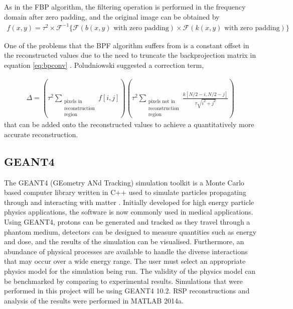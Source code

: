 \documentclass[11pt,a4paper]{article}
\begin{document}
As in the FBP algorithm, the filtering operation is performed in the frequency domain after zero padding, and the original image can be obtained by
\begin{align}
f(x,y) = \tau^2 \times \mathcal{F}^{-1}\{\mathcal{F}(b(x,y) \text{ with zero padding}) \times \mathcal{F}(k(x,y) \text{ with zero padding})\} 
\end{align}

One of the problems that the BPF algorithm suffers from is a constant offset in the reconstructed values due to the need to truncate the backprojection matrix in equation \ref{eq:bpconv} \cite{suzuki1988comparison}. Poludniowski suggested a correction term, 

\begin{eqnarray}
\Delta = \left( \tau^2 \sum_{\substack{\text{pixels in}\\\text{reconstruction}\\\text{region}}} f[i,j] \right) \left( \tau^2 \sum_{\substack{\text{pixels not in}\\\text{reconstruction}\\\text{region}}} \frac{k[N/2 - i, N/2 - j]}{\tau\sqrt{i^2 + j^2}}\right)
\label{eq:correction}
\end{eqnarray}
that can be added onto the reconstructed values to achieve a quantitatively more accurate reconstruction.

\subsection{GEANT4}
\label{sec:geant4}
The GEANT4 (GEometry ANd	Tracking) simulation toolkit is a Monte Carlo based computer library written in C++ used to simulate particles propagating through and interacting with matter \cite{agostinelli2003geant4}. Initially developed for high energy particle physics applications, the software is now commonly used in medical applications. Using GEANT4, protons can be generated and tracked as they travel through a phantom medium, detectors can be designed to measure quantities such as energy and dose, and the results of the simulation can be visualised. Furthermore, an abundance of physical processes are available to handle the diverse interactions that may occur over a wide energy range. The user must select an appropriate physics model for the simulation being run. The validity of the physics model can be benchmarked by comparing to experimental results. Simulations that were performed in this project will be using GEANT4 10.2. RSP reconstructions and analysis of the results were performed in MATLAB 2014a.
\end{document}

